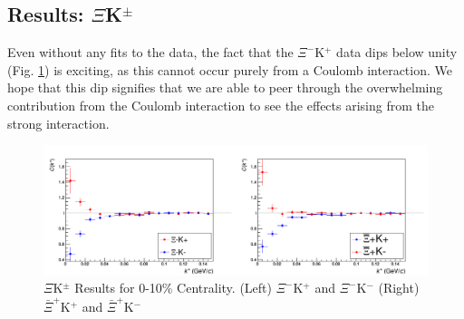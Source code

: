 \documentclass[../AnalysisNoteJBuxton.tex]{subfiles}
\begin{document}
\subsection{Results: \texorpdfstring{$\Xi$K$^{\pm}$}{TEXT}}
\label{ResultsXiK}

Even without any fits to the data, the fact that the $\Xi^{-}$K$^{+}$ data dips below unity (Fig. \ref{fig:XiKchwConjResults}) is exciting, as this cannot occur purely from a Coulomb interaction.  We hope that this dip signifies that we are able to peer through the overwhelming contribution from the Coulomb interaction to see the effects arising from the strong interaction.

\begin{figure}[h]
  \centering
  \includegraphics[width=\textwidth]{7_ResultsAndDiscussion/Figures/cXicKchKStarCfs.png}
  \caption[$\Xi$K$^{\pm}$ Results]{$\Xi$K$^{\pm}$ Results for 0-10\% Centrality.  (Left) $\Xi^{-}$K$^{+}$ and  $\Xi^{-}$K$^{-}$  (Right) $\bar{\Xi}^{+}$K$^{+}$ and  $\bar{\Xi}^{+}$K$^{-}$}
  \label{fig:XiKchwConjResults}
\end{figure}
\end{document}
